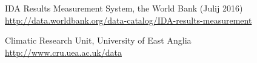\begin{thebibliography}{1}
 IDA Results Measurement System, the World Bank (Julij 2016)
\\ \url{http://data.worldbank.org/data-catalog/IDA-results-measurement}

 Climatic Research Unit, University of East Anglia
\\ \url{http://www.cru.uea.ac.uk/data}



\end{thebibliography}


